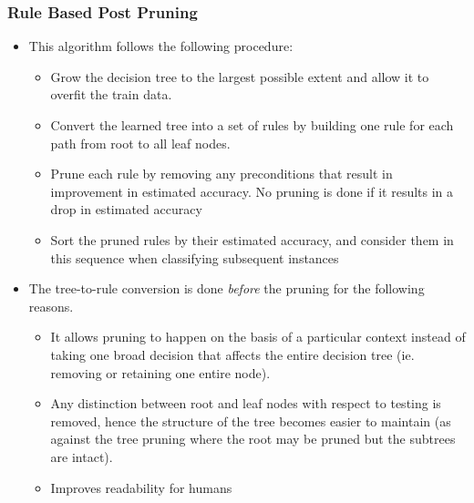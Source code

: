 \documentclass{article}
\theoremstyle{plain}
\theoremstyle{definition}
\begin{document}
\subsubsection{Rule Based Post Pruning}
\begin{itemize}
    \item This algorithm follows the following procedure:
    \begin{itemize}
        \item Grow the decision tree to the largest possible extent and allow it to overfit the train data.
        
        \item Convert the learned tree into a set of rules by building one rule for each path from root to all leaf nodes.
        
        \item Prune each rule by removing any preconditions that result in improvement in estimated accuracy. No pruning is done if it results in a drop in estimated accuracy
        
        \item Sort the pruned rules by their estimated accuracy, and consider them in this sequence when classifying subsequent instances
    \end{itemize}
    
    \item The tree-to-rule conversion is done \textit{before} the pruning for the following reasons.
    \begin{itemize}
        \item It allows pruning to happen on the basis of a particular context instead of taking one broad decision that affects the entire decision tree (ie. removing or retaining one entire node).
        
        \item Any distinction between root and leaf nodes with respect to testing is removed, hence the structure of the tree becomes easier to maintain (as against the tree pruning where the root may be pruned but the subtrees are intact).
        
        \item Improves readability for humans
    \end{itemize}
\end{itemize}
\end{document}
